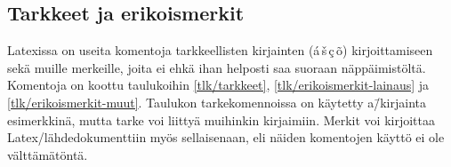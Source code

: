 \subsection{Tarkkeet ja erikoismerkit}
\label{luku/tarkkeet}

Latexissa on useita komentoja tarkkeellisten kirjainten
(\'a\,\v{s}\,\c{c}\,\~o) kirjoittamiseen sekä muille merkeille, joita ei
ehkä ihan helposti saa suoraan näppäimistöltä. Komentoja on koottu
taulukoihin \ref{tlk/tarkkeet}, \ref{tlk/erikoismerkit-lainaus} ja
\ref{tlk/erikoismerkit-muut}. Taulukon tarkekomennoissa on käytetty
a\=/kirjainta esimerkkinä, mutta tarke voi liittyä muihinkin kirjaimiin.
Merkit voi kirjoittaa Latex\-/lähdedokumenttiin myös sellaisenaan, eli
näiden komentojen käyttö ei ole välttämätöntä.

